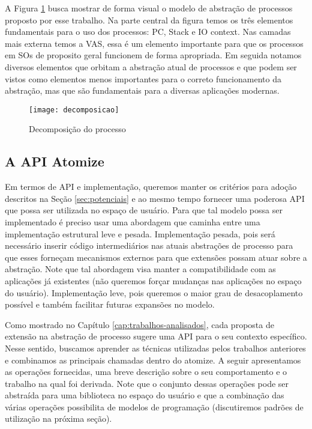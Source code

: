 

A Figura \ref{fig:decomposicao_proc} busca mostrar de forma visual o modelo de
abstração de processos proposto por esse trabalho. Na parte central da figura
temos os três elementos fundamentais para o uso dos processos: PC, Stack e IO
context. Nas camadas mais externa temos a VAS, essa é um elemento importante para
que os processos em SOs de proposito geral funcionem de forma apropriada. Em
seguida notamos diversos elementos que orbitam a abstração atual de processos e
que podem ser vistos como elementos menos importantes para o correto
funcionamento da abstração, mas que são fundamentais para a diversas aplicações
modernas.

\begin{figure}[!h]
  \centering
  \texttt{[image: decomposicao]}
  \caption{Decomposição do processo}
  \label{fig:decomposicao_proc}
\end{figure}

\subsection{A API Atomize}

Em termos de API e implementação, queremos manter os critérios para adoção
descritos na Seção \ref{sec:potenciais} e ao mesmo tempo fornecer uma poderosa
API que possa ser utilizada no espaço de usuário. Para que tal modelo possa ser
implementado é preciso usar uma abordagem que caminha entre uma implementação
estrutural leve e pesada. Implementação pesada, pois será necessário inserir
código intermediários nas atuais abstrações de processo para que esses forneçam
mecanismos externos para que extensões possam atuar sobre a abstração. Note que
tal abordagem visa manter a compatibilidade com as aplicações já existentes
(não queremos forçar mudanças nas aplicações no espaço do usuário).
Implementação leve, pois queremos o maior grau de desacoplamento possível e
também facilitar futuras expansões no modelo.

Como mostrado no Capítulo \ref{cap:trabalhos-analisados}, cada proposta de
extensão na abstração de processo sugere uma API para o seu contexto
específico. Nesse sentido, buscamos aprender as técnicas utilizadas pelos
trabalhos anteriores e combinamos as principais chamadas dentro do atomize. A
seguir apresentamos as operações fornecidas, uma breve descrição sobre o seu
comportamento  e o trabalho na qual foi derivada.  Note que o conjunto dessas
operações pode ser abstraída para uma biblioteca no espaço do usuário e que a
combinação das várias operações possibilita de modelos de programação
(discutiremos padrões de utilização na próxima seção). 

